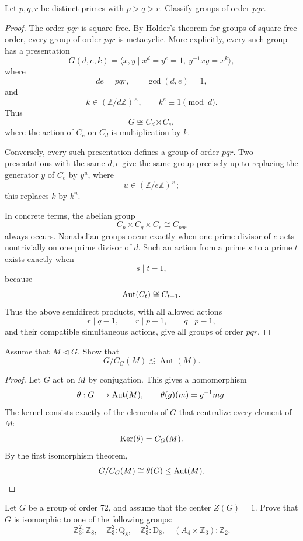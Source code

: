 \begin{exercise}
Let \(p,q,r\) be distinct primes with \(p > q > r\). Classify groups of order
\(pqr\).
\end{exercise}

\begin{proof}
The order \(pqr\) is square-free. By Holder's theorem for groups of square-free
order, every group of order \(pqr\) is metacyclic. More explicitly, every such
group has a presentation
\[
    G(d,e,k)
    =
    \langle x,y\mid x^d=y^e=1,\ y^{-1}xy=x^k\rangle,
\]
where
\[
    de=pqr,\qquad \gcd(d,e)=1,
\]
and
\[
    k\in(\mathbb Z/d\mathbb Z)^\times,
    \qquad
    k^e\equiv 1\pmod d.
\]
Thus
\[
    G\cong C_d\rtimes C_e,
\]
where the action of \(C_e\) on \(C_d\) is multiplication by \(k\).

Conversely, every such presentation defines a group of order \(pqr\). Two
presentations with the same \(d,e\) give the same group precisely up to replacing
the generator \(y\) of \(C_e\) by \(y^u\), where
\[
    u\in(\mathbb Z/e\mathbb Z)^\times;
\]
this replaces \(k\) by \(k^u\).

In concrete terms, the abelian group
\[
    C_p\times C_q\times C_r\cong C_{pqr}
\]
always occurs. Nonabelian groups occur exactly when one prime divisor of \(e\)
acts nontrivially on one prime divisor of \(d\). Such an action from a prime
\(s\) to a prime \(t\) exists exactly when
\[
    s\mid t-1,
\]
because
\[
    \operatorname{Aut}(C_t)\cong C_{t-1}.
\]
Thus the above semidirect products, with all allowed actions
\[
    r\mid q-1,\qquad r\mid p-1,\qquad q\mid p-1,
\]
and their compatible simultaneous actions, give all groups of order \(pqr\).
\end{proof}

\begin{exercise}
Assume that \(M \lhd G\). Show that
\[
    G/C_G(M) \lesssim \operatorname{Aut}(M).
\]
\end{exercise}

\begin{proof}
Let \(G\) act on \(M\) by conjugation. This gives a homomorphism
\[
    \theta:G\longrightarrow \operatorname{Aut}(M),
    \qquad
    \theta(g)(m)=g^{-1}mg.
\]
The kernel consists exactly of the elements of \(G\) that centralize every
element of \(M\):
\[
    \operatorname{Ker}(\theta)=C_G(M).
\]
By the first isomorphism theorem,
\[
    G/C_G(M)\cong \theta(G)\leq \operatorname{Aut}(M).
\]
\end{proof}

\begin{exercise}
Let \(G\) be a group of order \(72\), and assume that the center \(Z(G) = 1\).
Prove that \(G\) is isomorphic to one of the following groups:
\[
    \mathbb{Z}_3^2:\mathbb{Z}_8,\quad
    \mathbb{Z}_3^2:\mathrm{Q}_8,\quad
    \mathbb{Z}_3^2:\mathrm{D}_8,\quad
    (A_4 \times \mathbb{Z}_3):\mathbb{Z}_2.
\]
\end{exercise}

